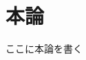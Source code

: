 \documentclass[main]{subfiles}
\begin{document}
\chapter{本論}
ここに本論を書く\cite{ref:yao2017integrated}\cite{ref:ugarte1992curling}
\end{document}
